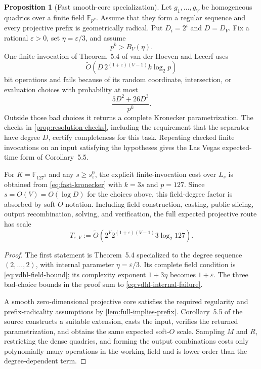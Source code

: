\documentclass[11pt,a4paper]{article}
\theoremstyle{definition}
\newtheorem{proposition}[theorem]{Proposition}
\theoremstyle{remark}
\newcommand{\F}{\mathbb F}
\begin{document}
\begin{proposition}[Fast smooth-core specialization]\label{prop:finite-field-kronecker}
Let $g_1,\ldots,g_V$ be homogeneous quadrics over a finite field $\F_{p^k}$.  Assume that they form a regular sequence and every projective prefix is geometrically radical.  Put $D_i=2^i$ and $D=D_V$.  Fix a rational $\varepsilon>0$, set $\eta=\varepsilon/3$, and assume
\[
 p^k>B_V(\eta).
\]
One finite invocation of Theorem~5.4 of van der Hoeven and Lecerf uses
\begin{equation}\label{eq:fast-kronecker}
 \widetilde O\!\left(D\,2^{(1+\varepsilon)(V-1)}k\log_2p\right)
\end{equation}
bit operations and fails because of its random coordinate, intersection, or evaluation choices with probability at most
\begin{equation}\label{eq:vdhl-internal-failure}
 \frac{5D^2+26D^3}{p^k}.
\end{equation}
Outside those bad choices it returns a complete Kronecker parametrization.  The checks in \cref{prop:resolution-checks}, including the requirement that the separator have degree $D$, certify completeness for this task.  Repeating checked finite invocations on an input satisfying the hypotheses gives the Las Vegas expected-time form of Corollary~5.5.

For $K=\F_{127^3}$ and any $s\ge s_\varepsilon^0$, the explicit finite-invocation cost over $L_s$ is obtained from \eqref{eq:fast-kronecker} with $k=3s$ and $p=127$.  Since $s=O(V)=O(\log D)$ for the choices above, this field-degree factor is absorbed by soft-$O$ notation.  Including field construction, casting, public slicing, output recombination, solving, and verification, the full expected projective route has scale
\begin{equation}\label{eq:fast-solver-scale}
 T_{\varepsilon,V}
 :=\widetilde O\!\left(
 2^V2^{(1+\varepsilon)(V-1)}3\log_2 127
 \right).
\end{equation}
\end{proposition}

\begin{proof}
The first statement is Theorem~5.4 specialized to the degree sequence $(2,\ldots,2)$, with internal parameter $\eta=\varepsilon/3$.  Its complete field condition is \eqref{eq:vdhl-field-bound}; its complexity exponent $1+3\eta$ becomes $1+\varepsilon$.  The three bad-choice bounds in the proof sum to \eqref{eq:vdhl-internal-failure}.

A smooth zero-dimensional projective core satisfies the required regularity and prefix-radicality assumptions by \cref{lem:full-implies-prefix}.  Corollary~5.5 of the source constructs a suitable extension, casts the input, verifies the returned parametrization, and obtains the same expected soft-$O$ scale.  Sampling $M$ and $R$, restricting the dense quadrics, and forming the output combinations costs only polynomially many operations in the working field and is lower order than the degree-dependent term.
\end{proof}
\end{document}
